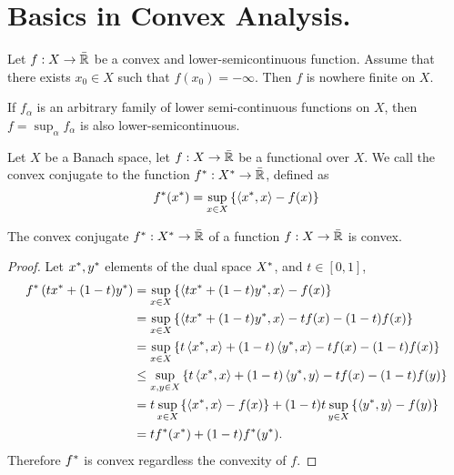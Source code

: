 \chapter{Basics in Convex Analysis.}

\begin{proposition}
Let $f: X \rightarrow \bar{\mathbb{R}}$ be a convex and lower-semicontinuous function.
Assume that there exists $x_0 \in X$ such that $f(x_0) = -\infty$. Then $f$ is nowhere finite on $X$.
\end{proposition} 


\begin{theorem} If $ f_\alpha $ is an arbitrary family of lower semi-continuous functions on $X$, then $f=\sup_\alpha f_\alpha$ is also lower-semicontinuous.
\end{theorem}


\begin{definition}
Let $X$ be a Banach space, let $f:X\rightarrow \bar{\mathbb{R}}$ be a functional over $X$. We call the convex conjugate to the function ${f}^*: {X}^*\rightarrow \bar{\mathbb{R}}$, defined as
\begin{equation*}
	{f}^*({x}^*)=\sup_{x\in X} \left\lbrace \left\langle {x}^*, x \right\rangle-f(x) \right\rbrace
\end{equation*}	
\end{definition}

\begin{proposition}
	The convex conjugate ${f}^*:{X}^*\rightarrow \bar{\mathbb{R}}$ of a function $f:X\rightarrow\bar{\mathbb{R}}$ is convex.
	\begin{proof}
		Let ${x}^*, {y}^*$ elements of the dual space ${X}^*$, and $t\in[0,1]$,
		\begin{align*}
			{f}^*\left( t{x}^*+(1-t){y}^* \right)&=\sup_{x\in X}\left\lbrace \left\langle t{x}^*+(1-t){y}^*, x \right\rangle-f(x) \right\rbrace \\
			&=\sup_{x\in X}\left\lbrace \left\langle t{x}^*+(1-t){y}^*, x \right\rangle-tf(x)-(1-t)f(x) \right\rbrace\\
			&=\sup_{x\in X}\left\lbrace t\left\langle {x}^*, x \right\rangle+(1-t)\left\langle {y}^*, x \right\rangle-tf(x)-(1-t)f(x) \right\rbrace\\
			&\leq \sup_{x, y \in X} \left\lbrace t\left\langle {x}^*, x \right\rangle+(1-t)\left\langle {y}^*, y \right\rangle-tf(x)-(1-t)f(y) \right\rbrace\\
			&=t\sup_{x \in X} \left\lbrace \left\langle {x}^*, x \right\rangle-f(x) \right\rbrace+(1-t)t\sup_{y \in X} \left\lbrace \left\langle {y}^*, y \right\rangle-f(y) \right\rbrace\\
			&=t{f}^*({x}^*)+(1-t){f}^*({y}^*).
		\end{align*}
		Therefore ${f}^*$ is convex regardless the convexity of $f$.
	\end{proof}
\end{proposition}

